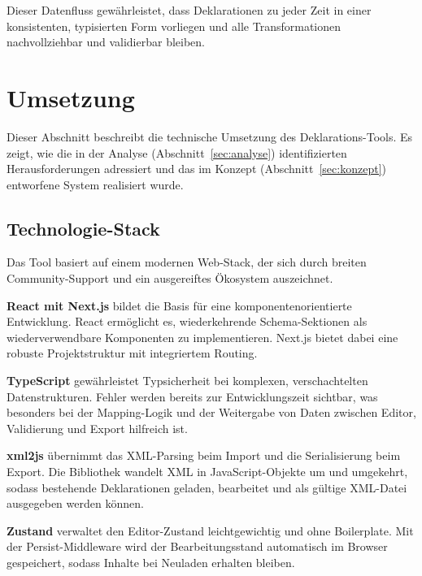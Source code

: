 \documentclass[a4paper,12pt]{article}
\begin{document}
\noindent Dieser Datenfluss gewährleistet, dass Deklarationen zu jeder Zeit in einer konsistenten, typisierten 
Form vorliegen und alle Transformationen nachvollziehbar und validierbar bleiben.

\newpage

\section{Umsetzung}
\label{sec:umsetzung}

Dieser Abschnitt beschreibt die technische Umsetzung des Deklarations-Tools. Es zeigt, wie die in der 
Analyse (Abschnitt~\ref{sec:analyse}) identifizierten Herausforderungen adressiert und das im Konzept 
(Abschnitt~\ref{sec:konzept}) entworfene System realisiert wurde.

\subsection{Technologie-Stack}

Das Tool basiert auf einem modernen Web-Stack, der sich durch breiten Community-Support und ein 
ausgereiftes Ökosystem auszeichnet. \newline

\noindent\textbf{React mit Next.js} bildet die Basis für eine komponentenorientierte Entwicklung. React ermöglicht 
es, wiederkehrende Schema-Sektionen als wiederverwendbare Komponenten zu implementieren. Next.js bietet dabei 
eine robuste Projektstruktur mit integriertem Routing. \newline

\noindent\textbf{TypeScript} gewährleistet Typsicherheit bei komplexen, verschachtelten Datenstrukturen. Fehler 
werden bereits zur Entwicklungszeit sichtbar, was besonders bei der Mapping-Logik und der Weitergabe von Daten 
zwischen Editor, Validierung und Export hilfreich ist. \newline

\noindent\textbf{xml2js} übernimmt das XML-Parsing beim Import und die Serialisierung beim Export. Die Bibliothek 
wandelt XML in JavaScript-Objekte um und umgekehrt, sodass bestehende Deklarationen geladen, bearbeitet und als 
gültige XML-Datei ausgegeben werden können. \newline

\noindent\textbf{Zustand} verwaltet den Editor-Zustand leichtgewichtig und ohne Boilerplate. Mit der 
Persist-Middleware wird der Bearbeitungsstand automatisch im Browser gespeichert, sodass Inhalte bei Neuladen 
erhalten bleiben. \newline
\end{document}
